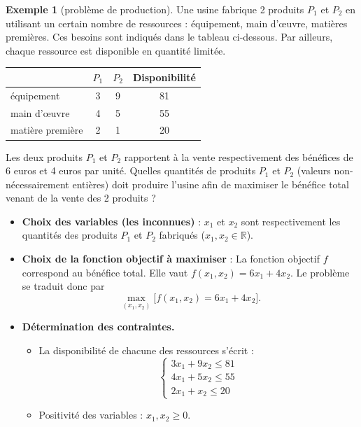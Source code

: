 \documentclass[a4paper,12pt,openany]{book}
\theoremstyle{plain}
\theoremstyle{definition}
\newtheorem{exemple}[theorem]{Exemple}
\theoremstyle{remark}
\theoremstyle{nbstyle}
\begin{document}
	
	\begin{exemple}[problème de production]
		Une usine fabrique 2 produits $P_1$ et $P_2$ en utilisant un certain nombre de ressources : équipement, main d'œuvre, matières premières. Ces besoins sont indiqués dans le tableau ci-dessous. Par ailleurs, chaque ressource est disponible en quantité limitée.
		
		\begin{center}
			\begin{tabular}{|l|c|c|c|}
				\hline\hline
				& $P_1$ & $P_2$ & Disponibilité \\
				\hline\hline
				équipement & 3 & 9 & 81 \\
				\hline
				main d'œuvre & 4 & 5 & 55 \\
				\hline
				matière première & 2 & 1 & 20 \\
				\hline\hline
			\end{tabular}
		\end{center}
		
		Les deux produits $P_1$ et $P_2$ rapportent à la vente respectivement des bénéfices de 6 euros et 4 euros par unité. Quelles quantités de produits $P_1$ et $P_2$ (valeurs non-nécessairement entières) doit produire l'usine afin de maximiser le bénéfice total venant de la vente des 2 produits ?
		
		\begin{itemize}
			\item \textbf{Choix des variables (les inconnues)} : $x_1$ et $x_2$ sont respectivement les quantités des produits $P_1$ et $P_2$ fabriqués ($x_1, x_2 \in \mathbb{R}$).
			
			\item \textbf{Choix de la fonction objectif à maximiser} : La fonction objectif $f$ correspond au bénéfice total. Elle vaut $f(x_1, x_2) = 6x_1 + 4x_2$. Le problème se traduit donc par
			\[ \displaystyle\max_{(x_1, x_2)} \Big[f(x_1, x_2) = 6x_1 + 4x_2\Big]. \]
			
			\item \textbf{Détermination des contraintes.}
			\begin{itemize}
				\item La disponibilité de chacune des ressources s'écrit :
				\[
				\begin{cases}
				3x_1 + 9x_2 \leq 81 \\
				4x_1 + 5x_2 \leq 55 \\
				2x_1 + x_2 \leq 20
				\end{cases}
				\]
				\item Positivité des variables : $x_1, x_2 \geq 0$.
			\end{itemize}
		\end{itemize}
		

\end{exemple}
\end{document}
